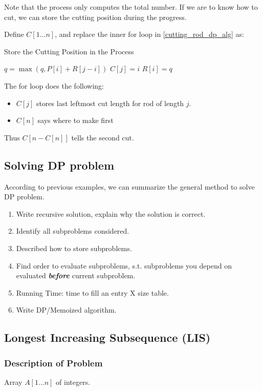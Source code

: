 Note that the process only computes the total number. If we are to know how to cut, we can store the cutting position during the progress.

Define $C[1...n]$, and replace the inner for loop in \cref{cutting_rod_dp_alg} as:
\begin{algorithm}[H]
\caption{Store the Cutting Position in the Process}
\begin{algorithmic}[1]
    \State $q = \max(q, P[i] + R[j-i])$
    \State $C[j] = i$
\EndFor
\State $R[i] = q$
\end{algorithmic}
\end{algorithm}

The for loop does the following:
\begin{itemize}
\item $C[j]$ stores last leftmost cut length for rod of length $j$.
\item $C[n]$ says where to make first
\end{itemize}

Thus $C[n - C[n]]$ tells the second cut.

\subsection{Solving DP problem}
According to previous examples, we can summarize the general method to solve DP problem.

\begin{enumerate}
\item Write recursive solution, explain why the solution is correct.
\item Identify all subproblems considered.
\item Described how to store subproblems.
\item Find order to evaluate subproblems, s.t. subproblems you depend on evaluated \textbf{\textit{before}} current subproblem.
\item Running Time: time to fill an entry X size table.
\item Write DP/Memoized algorithm.
\end{enumerate}

\subsection{Longest Increasing Subsequence (LIS)}
\subsubsection{Description of Problem}
\AlgoInput Array $A[1...n]$ of integers.

